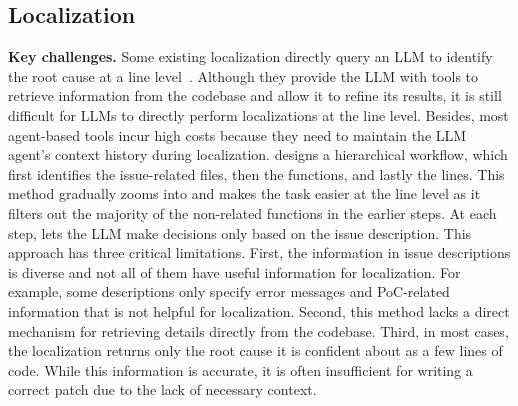 \subsection{Localization}
\label{subsec:localization}

\textbf{Key challenges.}
Some existing localization directly query an LLM to identify the root cause at a line level~\cite{yang2024swe,arora2024masai,zhang2024autocoderover}.
Although they provide the LLM with tools to retrieve information from the codebase and allow it to refine its results, it is still difficult for LLMs to directly perform localizations at the line level. 
Besides, most agent-based tools incur high costs because they need to maintain the LLM agent's context history during localization.
\agentless{} designs a hierarchical workflow, which first identifies the issue-related files, then the functions, and lastly the lines.
This method gradually zooms into and makes the task easier at the line level as it filters out the majority of the non-related functions in the earlier steps. 
At each step, \agentless{} lets the LLM make decisions only based on the issue description. 
This approach has three critical limitations. 
First, the information in issue descriptions is diverse and not all of them have useful information for localization.
For example, some descriptions only specify error messages and PoC-related information that is not helpful for localization. 
Second, this method lacks a direct mechanism for retrieving details directly from the codebase.
Third, in most cases, the localization returns only the root cause it is confident about as a few lines of code. 
While this information is accurate, it is often insufficient for writing a correct patch due to the lack of necessary context.

